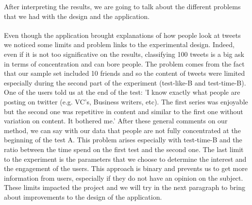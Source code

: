 After interpreting the results, we are going to talk about the different problems that we had with the design and the application.

\paragraph{}
Even though the application brought explanations of how people look at tweets we noticed some limits and problem links to the experimental design. Indeed, even if it is not too significative on the results, classifying 100 tweets is a big ask in terms of concentration and can bore people. The problem comes from the fact that our sample set included 10 friends and so the content of tweets were limited especially during the second part of the experiment (test-like-B and test-time-B). One of the users told us at the end of the test:
'I know exactly what people are posting on twitter (e.g. VC's, Business writers, etc). The first series was enjoyable but the second one was repetitive in content and similar to the first one without variation on content. It bothered me.'
After these general comments on our method, we can say with our data that people are not fully concentrated at the beginning of the test A. This problem arises especially with test-time-B and the ratio between the time spend on the first test and the second one.
The last limit to the experiment is the parameters that we choose to determine the interest and the engagement of the users. This approach is binary and prevents us to get more information from users, especially if they do not have an opinion on the subject.
These limits impacted the project and we will try in the next paragraph to bring about improvements to the design of the application.

